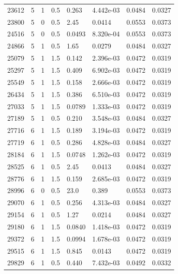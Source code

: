\documentclass[preview]{standalone}
\begin{document}
{{{\begin{tabular}{L{1.2cm}C{1.2cm} C{0.3cm}C{0.5cm} C{1.4cm}C{1.4cm} C{1.4cm}C{1.4cm}}
  23612  &     5  & 1     & 0.5 &  0.263  & 4.442e-03  & 0.0484 &  0.0327   \\ 
  23800  &     5  & 0     & 0.5 &  2.45  & 0.0414  & 0.0553 &  0.0373   \\ 
  24516  &     5  & 0     & 0.5 &  0.0493  & 8.320e-04  & 0.0553 &  0.0373   \\ 
  24866  &     5  & 1     & 0.5 &  1.65  & 0.0279  & 0.0484 &  0.0327   \\ 
  25079  &     5  & 1     & 1.5 &  0.142  & 2.396e-03  & 0.0472 &  0.0319   \\ 
  25297  &     5  & 1     & 1.5 &  0.409  & 6.902e-03  & 0.0472 &  0.0319   \\ 
  25549  &     5  & 1     & 1.5 &  0.158  & 2.666e-03  & 0.0472 &  0.0319   \\ 
  26434  &     5  & 1     & 1.5 &  0.386  & 6.510e-03  & 0.0472 &  0.0319   \\ 
  27033  &     5  & 1     & 1.5 &  0.0789  & 1.333e-03  & 0.0472 &  0.0319   \\ 
  27189  &     5  & 1     & 0.5 &  0.210  & 3.548e-03  & 0.0484 &  0.0327   \\ 
  27716  &     6  & 1     & 1.5 &  0.189  & 3.194e-03  & 0.0472 &  0.0319   \\ 
  27719  &     6  & 1     & 0.5 &  0.286  & 4.828e-03  & 0.0484 &  0.0327   \\ 
  28184  &     6  & 1     & 1.5 &  0.0748  & 1.262e-03  & 0.0472 &  0.0319   \\ 
  28525  &     6  & 1     & 0.5 &  2.45  & 0.0413  & 0.0484 &  0.0327   \\ 
  28776  &     6  & 1     & 1.5 &  0.159  & 2.685e-03  & 0.0472 &  0.0319   \\ 
  28996  &     6  & 0     & 0.5 &  23.0  & 0.389  & 0.0553 &  0.0373   \\ 
  29070  &     6  & 1     & 0.5 &  0.256  & 4.313e-03  & 0.0484 &  0.0327   \\ 
  29154  &     6  & 1     & 0.5 &  1.27  & 0.0214  & 0.0484 &  0.0327   \\ 
  29180  &     6  & 1     & 1.5 &  0.0840  & 1.418e-03  & 0.0472 &  0.0319   \\ 
  29372  &     6  & 1     & 1.5 &  0.0994  & 1.678e-03  & 0.0472 &  0.0319   \\ 
  29515  &     6  & 1     & 1.5 &  0.845  & 0.0143  & 0.0472 &  0.0319   \\ 
  29829  &     6  & 1     & 0.5 &  0.440  & 7.432e-03  & 0.0492 &  0.0332   \\ 

\end{tabular}}}}
\end{document}

